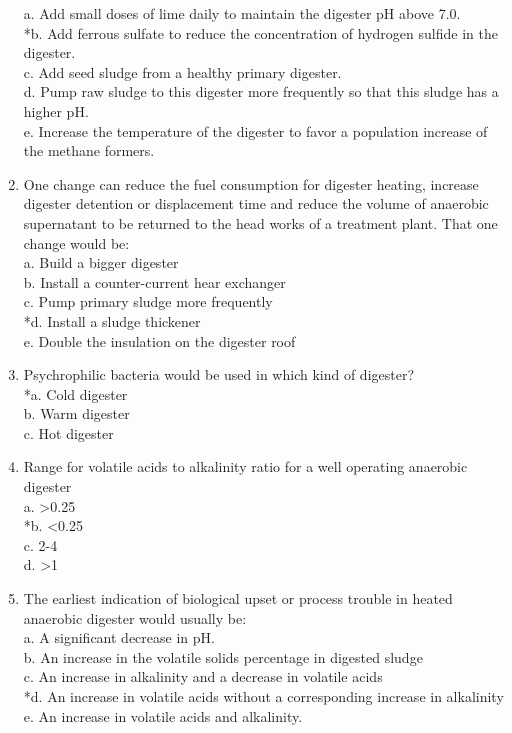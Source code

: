 \documentclass{article}
\begin{document}
\begin{enumerate}
a. Add small doses of lime daily to maintain the digester pH above 7.0. \\
*b. Add ferrous sulfate to reduce the concentration of hydrogen sulfide in the digester. \\
c. Add seed sludge from a healthy primary digester. \\
d. Pump raw sludge to this digester more frequently so that this sludge has a higher pH. \\
e. Increase the temperature of the digester to favor a population increase of the methane formers. \\

\item  One change can reduce the fuel consumption for digester heating, increase digester detention or displacement time and reduce the volume of anaerobic supernatant to be returned to the head works of a treatment plant. That one change would be: \\

a. Build a bigger digester \\
b. Install a counter-current hear exchanger \\
c. Pump primary sludge more frequently \\
*d. Install a sludge thickener \\
e. Double the insulation on the digester roof \\

\item  Psychrophilic bacteria would be used in which kind of digester? \\

*a. Cold digester \\
b. Warm digester \\
c. Hot digester \\

\item  Range for volatile acids to alkalinity ratio for a well operating anaerobic digester \\

a. >0.25 \\
*b. <0.25 \\
c. 2-4 \\
d. >1 \\

\item  The earliest indication of biological upset or process trouble in heated anaerobic digester would usually be: \\

a. A significant decrease in pH. \\
b. An increase in the volatile solids percentage in digested sludge \\
c. An increase in alkalinity and a decrease in volatile acids \\
*d. An increase in volatile acids without a corresponding increase in alkalinity \\
e. An increase in volatile acids and alkalinity. \\


\end{enumerate}
\end{document}
